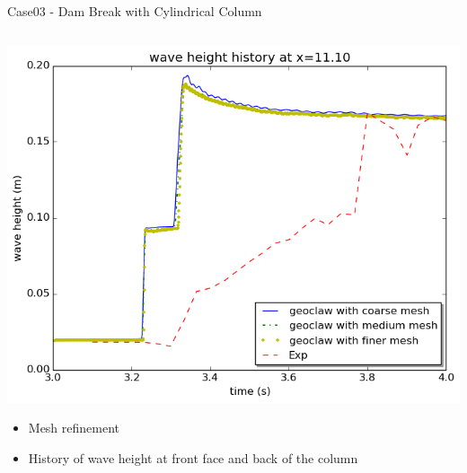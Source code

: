 \documentclass[xcolor=dvipsnames]{beamer}
\begin{document}
\begin{frame}[label=sec-5-7]{Case03 - Dam Break with Cylindrical Column}
\begin{columns}
\begin{column}{0.5\textwidth}
\begin{block}{}
\includegraphics[width=.9\linewidth]{../paper/plots/waveheight_cylinder_x11_finer_new.png} \\
\begin{itemize}
\item Mesh refinement
\item History of wave height at front face and back of the column
\end{itemize}
\vskip15mm
\end{block}
\end{column}


\end{columns}
\end{frame}
\end{document}
